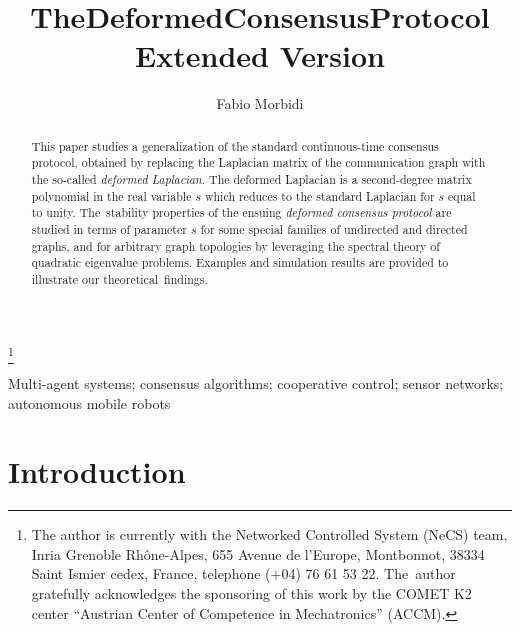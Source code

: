 \documentclass[letterpaper,9pt,twocolumn]{autart}
\begin{document}
\runauthor{}
\begin{frontmatter}
\title{The\hspace{0.27cm}Deformed\hspace{0.27cm}Consensus\hspace{0.27cm}Protocol\vspace{0.22cm}\\
\normalsize{Extended Version}}

\thanks[footnoteinfo]{The author is currently with the Networked Controlled System (NeCS)
team, Inria Grenoble Rh\^{o}ne-Alpes, 655 \mbox{Avenue} de l'Europe, Montbonnot,
38334 Saint Ismier cedex, France, telephone ($+$04) 76 61 53 22. 
The~author gratefully acknowledges the sponsoring of this work by the COMET K2 center 
``Austrian Center of Competence in \mbox{Mechatronics}'' (ACCM).}


\author[INRIA]{Fabio Morbidi}
\address[INRIA]{Institute for Design and Control of Mechatronical Systems,
Johannes Kepler University, \mbox{Altenbergerstra\ss e 69, 4040 Linz, Austria}}

\begin{keyword} Multi-agent systems;\; consensus algorithms;\; cooperative control;\; sensor
networks;\; autonomous mobile robots 
\end{keyword}

\begin{abstract}
This paper studies a generalization of the standard continuous-time consensus protocol, obtained
by replacing the Laplacian matrix of the communication graph with the so-called
\emph{deformed Laplacian}. The deformed Laplacian is a second-degree matrix polynomial in the
real variable $s$ which reduces to the standard Laplacian for $s$ equal to unity.
The~stability properties of the ensuing \emph{deformed consensus protocol} are studied in terms
of parameter $s$ for some special families of undirected and directed graphs, and for arbitrary graph
topologies by leveraging the spectral theory of quadratic eigenvalue problems. Examples and
simulation results are provided to illustrate our theoretical~findings. \end{abstract}
\end{frontmatter}
\thispagestyle{empty} 
\pagestyle{empty} 
\pagestyle{plain}

\section{Introduction}\label{SEC:intro}
\end{document}
